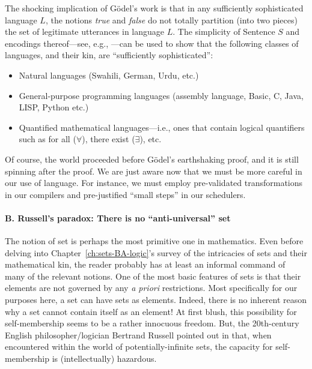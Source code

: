 The shocking implication of G\"{o}del's work is that in any
sufficiently sophisticated language $L$, the notions {\it true} and
{\it false} do not totally partition (into two pieces) the set of
legitimate utterances in language $L$.  The simplicity of Sentence $S$
and encodings thereof---see, e.g., \cite{Rosenberg09}---can be used to
show that the following classes of languages, and their kin, are
``sufficiently sophisticated'':
\begin{itemize}
\item
Natural languages (Swahili, German, Urdu, etc.)
\item
General-purpose programming languages (assembly language, Basic, C,
Java, LISP, Python etc.)
\item
Quantified mathematical languages---i.e., ones that contain logical
quantifiers such as {\sc for all} ($\forall$), {\sc there exist}
($\exists$), etc.
\end{itemize}

Of course, the world proceeded before G\"{o}del's earthshaking proof,
and it is still spinning after the proof.  We are just aware now that
we must be more careful in our use of language.  For instance, we must
employ pre-validated transformations in our compilers and
pre-justified ``small steps'' in our schedulers.


\paragraph{\small\sf B.  Russell's paradox: There is no ``anti-universal'' set}

The notion of set is perhaps the most primitive one in mathematics.
Even before delving into Chapter~\ref{ch:sets-BA-logic}'s survey of
the intricacies of sets and their mathematical kin, the reader
probably has at least an informal command of many of the relevant
notions.  One of the most basic features of sets is that their
elements are not governed by any {\it a priori} restrictions.  Most
specifically for our purposes here, a set can have sets as elements.
Indeed, there is no inherent reason why a set cannot contain itself as
an element!  At first blush, this possibility for self-membership
seems to be a rather innocuous freedom.  But, the 20th-century English
philosopher/logician Bertrand Russell
pointed out in \cite{Russell02,Russell03} that, when encountered
within the world of potentially-infinite sets, the capacity for
self-membership is (intellectually) hazardous.

